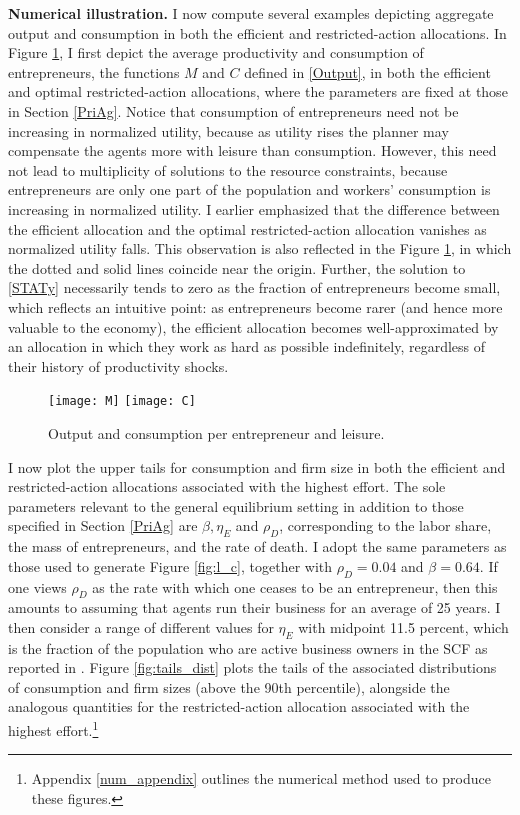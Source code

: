 \documentclass[11pt]{article}
\theoremstyle{plain}
\newcommand{\betaval}{0.64}
\begin{document}
\textbf{Numerical illustration.} I now compute several examples depicting aggregate output and consumption in both the efficient and restricted-action allocations. In Figure \ref{fig:RC_pre}, I first depict the average productivity and consumption of entrepreneurs, the functions $M$ and $C$ defined in \eqref{Output}, in both the efficient and optimal restricted-action allocations, where the parameters are fixed at those in Section \ref{PriAg}. Notice that consumption of entrepreneurs need not be increasing in normalized utility, because as utility rises the planner may compensate the agents more with leisure than consumption. However, this need not lead to multiplicity of solutions to the resource constraints, because entrepreneurs are only one part of the population and workers' consumption is increasing in normalized utility. I earlier emphasized that the difference between the efficient allocation and the optimal restricted-action allocation vanishes as normalized utility falls. This observation is also reflected in the Figure \ref{fig:RC_pre}, in which the dotted and solid lines coincide near the origin. Further, the solution to \eqref{STATy} necessarily tends to zero as the fraction of entrepreneurs become small, which reflects an intuitive point: as entrepreneurs become rarer (and hence more valuable to the economy), the efficient allocation becomes well-approximated by an allocation in which they work as hard as possible indefinitely, regardless of their history of productivity shocks.

\begin{figure}[H]
\centering
\texttt{[image: M]}
\texttt{[image: C]}
\caption{Output and consumption per entrepreneur and leisure.}\label{fig:RC_pre}
\end{figure}%

I now plot the upper tails for consumption and firm size in both the efficient and restricted-action allocations associated with the highest effort. The sole parameters relevant to the general equilibrium setting in addition to those specified in Section \ref{PriAg} are $\beta, \eta_E$ and $\rho_D$, corresponding to the labor share, the mass of entrepreneurs, and the rate of death. I adopt the same parameters as those used to generate Figure \ref{fig:l_c}, together with $\rho_D = 0.04$ and $\beta = \betaval$. If one views $\rho_D$ as the rate with which one ceases to be an entrepreneur, then this amounts to assuming that agents run their business for an average of 25 years. I then consider a range of different values for $\eta_E$ with midpoint 11.5 percent, which is the fraction of the population who are active business owners in the SCF as reported in \cite{cagetti_entrepreneurship_2006}. Figure \ref{fig:tails_dist} plots the tails of the associated distributions of consumption and firm sizes (above the 90th percentile), alongside the analogous quantities for the restricted-action allocation associated with the highest effort.\footnote{Appendix \ref{num_appendix} outlines the numerical method used to produce these figures.}
\end{document}
